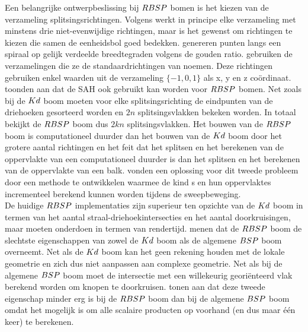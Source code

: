     Een belangrijke ontwerpbeslissing bij $RBSP$ bomen is het kiezen van de verzameling splitsingsrichtingen. 
    Volgens \authorBudge{} \cite{Budge} werkt in principe elke verzameling met minstens drie niet-evenwijdige richtingen, maar is het gewenst om richtingen te kiezen die samen de eenheidsbol goed bedekken.
    \authorKammaje{} \cite{Kammaje} genereren punten langs een spiraal op gelijk verdeelde breedtegraden volgens de gouden ratio.
    \authorBudge{} \cite{Budge} gebruiken de verzamelingen die ze de standaardrichtingen van \authorKlosowki{} \cite{klosowski1998efficient} noemen.
    Deze richtingen gebruiken enkel waarden uit de verzameling $\{-1, 0, 1\}$ als x, y en z coördinaat. %
    \\

    \authorKammaje{} \cite{Kammaje} toonden aan dat de SAH ook gebruikt kan worden voor $RBSP$ bomen. Net zoals bij de $Kd$ boom moeten voor elke splitsingsrichting de eindpunten van de driehoeken gesorteerd worden en $2n$ splitsingsvlakken bekeken worden. In totaal bekijkt de $RBSP$ boom dus $2kn$ splitsingsvlakken. Het bouwen van de $RBSP$ boom is computationeel duurder dan het bouwen van de $Kd$ boom door het grotere aantal richtingen en het feit dat het splitsen en het berekenen van de oppervlakte van een \symKDOP{} computationeel duurder is dan het splitsen en het berekenen van de oppervlakte van een balk. \authorBudge{} \cite{Budge} vonden een oplossing voor dit tweede probleem door een methode te ontwikkelen waarmee de kind \symKDOP s en hun oppervlaktes incrementeel berekend kunnen worden tijdens de sweepbeweging.\\

    De huidige $RBSP$ implementaties zijn superieur ten opzichte van de $Kd$ boom in termen van het aantal straal-driehoekintersecties en het aantal doorkruisingen, maar moeten onderdoen in termen van rendertijd.
    \authorIze{} \cite{ize} menen dat de $RBSP$ boom de slechtste eigenschappen van zowel de $Kd$ boom als de algemene $BSP$ boom overneemt. 
    Net als de $Kd$ boom kan het geen rekening houden met de lokale geometrie en zich dus niet aanpassen aan complexe geometrie.
    Net als bij de algemene $BSP$ boom moet de intersectie met een willekeurig georiënteerd vlak berekend worden om knopen te doorkruisen. \authorBudge{} \cite{Budge} tonen aan dat deze tweede eigenschap minder erg is bij de $RBSP$ boom dan bij de algemene $BSP$ boom omdat het mogelijk is om alle scalaire producten op voorhand (en dus maar één keer) te berekenen.

